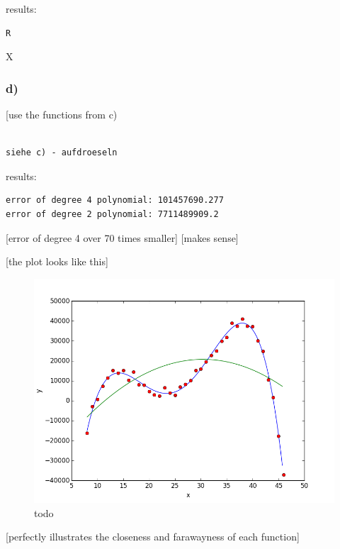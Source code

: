 results:

\begin{lstlisting}[caption=Result of 1.1 a), keywordstyle=\color{black}]
R
\end{lstlisting}

X



\subsubsection{d)}

[use the functions from c) 

\begin{lstlisting}[caption=todo]

siehe c) - aufdroeseln

\end{lstlisting}


results:

\begin{lstlisting}[caption=Result of 1.1 a), keywordstyle=\color{black}]
error of degree 4 polynomial: 101457690.277
error of degree 2 polynomial: 7711489909.2
\end{lstlisting}

[error of degree 4 over 70 times smaller] [makes sense]

[the plot looks like this]

\begin{figure}[!ht]
\includegraphics[width=1\textwidth]{chapters/images/figure-5-10-d}
\caption{todo}
\end{figure}

[perfectly illustrates the closeness and farawayness of each function]


